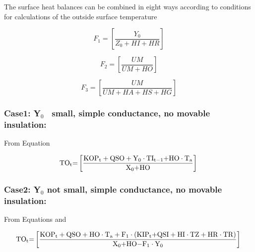 The surface heat balances can be combined in eight ways according to conditions for calculations of the outside surface temperature

\begin{equation}
{F_1} = \left[ {\frac{{{Y_0}}}{{{Z_0} + HI + HR}}} \right]
\end{equation}

\begin{equation}
{F_2} = \left[ {\frac{{UM}}{{UM + HO}}} \right]
\end{equation}

\begin{equation}
{F_3} = \left[ {\frac{{UM}}{{UM + HA + HS + HG}}} \right]
\end{equation}

\subsubsection{\texorpdfstring{Case1: Y\(_{0}\)~ small, simple conductance, no movable insulation:}{Case1: Y\_\{0\}~ small, simple conductance, no movable insulation:}}\label{case1-yux5f0-small-simple-conductance-no-movable-insulation}

From Equation

\begin{equation}
{\rm{T}}{{\rm{O}}_{\rm{t}}}{\rm{ = }}\left[ {\frac{{{\rm{KO}}{{\rm{P}}_{\rm{t}}} + {\rm{QSO}} + {{\rm{Y}}_0}\cdot {\rm{T}}{{\rm{I}}_{{\rm{t - 1}}}}{\rm{ + HO}}\cdot {{\rm{T}}_{\rm{a}}}}}{{{{\rm{X}}_{\rm{0}}}{\rm{ + HO}}}}} \right]{\rm{  }}
\end{equation}

\subsubsection{\texorpdfstring{Case2: Y\(_{0}\) not small, simple conductance, no movable insulation:}{Case2: Y\_\{0\} not small, simple conductance, no movable insulation:}}\label{case2-yux5f0-not-small-simple-conductance-no-movable-insulation}

From Equations and

\begin{equation}
{\rm{T}}{{\rm{O}}_{\rm{t}}}{\rm{ = }}\left[ {\frac{{{\rm{KO}}{{\rm{P}}_{\rm{t}}} + {\rm{QSO}} + {\rm{HO}}\cdot {{\rm{T}}_{\rm{a}}} + {{\rm{F}}_1}\cdot \left( {{\rm{KI}}{{\rm{P}}_{\rm{t}}}{\rm{ + QSI + HI}}\cdot {\rm{TZ + HR}}\cdot {\rm{TR}}} \right)}}{{{{\rm{X}}_{\rm{0}}}{\rm{ + HO - }}{{\rm{F}}_{\rm{1}}}\cdot {{\rm{Y}}_0}}}} \right]{\rm{  }}
\end{equation}

